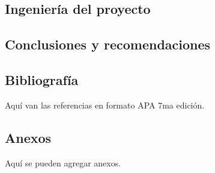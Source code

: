 \documentclass[12pt,letterpaper]{report}
\begin{document}
	\newpage
	\begin{center}
	\section{Ingeniería del proyecto}
	\end{center}
	
	\newpage
	\begin{center}
	\section{Conclusiones y recomendaciones}
	\end{center}
	
	\newpage
	\begin{center}
	\section*{Bibliografía}
	\end{center}
	Aquí van las referencias en formato APA 7ma edición.
	
	\newpage
	\begin{center}
	\section*{Anexos}
	\end{center}
	Aquí se pueden agregar anexos.
	
\end{document}
